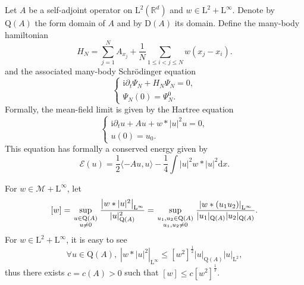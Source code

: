 \documentclass{article}
\def\R{\mathbb R}
\def\L{\mathrm L}
\def\Q{\mathrm Q}
\def \p {\partial}
\def\d{\mathrm{d}}
\newcommand{\Atop}[2]{\genfrac{}{}{0pt}{1}{#1}{#2}}
\theoremstyle{definition}
\numberwithin{equation}{section}
\newcommand{\complexI}{\mathrm{i}} %
\begin{document}
Let $A$ be a self-adjoint operator on $\L^2(\R^d)$ and $w\in\L^2+\L^\infty$. Denote by $\Q(A)$ the form domain of $A$ and by $\mathrm{D}(A)$ its domain. Define the many-body hamiltonian 
\begin{equation}\label{Eq:ManyBodyHamiltonian}
    H_{N} =\sum_{j=1}^N A_{x_j} + \frac{1}{N}\sum_{1\leqslant i<j\leqslant N} w(x_j-x_i).
\end{equation}
and the associated many-body Schrödinger equation 
\begin{equation}\label{Eq:ManyBodySchrodinger}
    \begin{cases}
    \complexI\p_t\Psi_N+H_{N}\Psi_N=0,\\
    \Psi_N(0)=\Psi_N^0.
    \end{cases}
\end{equation}
Formally, the mean-field limit is given by the Hartree equation
\begin{equation}\label{Eq:Hartree}
    \begin{cases}
    \complexI\p_t u + A u + w*|u|^2 u = 0,\\
    u(0)=u_0.
    \end{cases}
\end{equation}
This equation has formally a conserved energy given by
\begin{equation}\label{Eq:DefEnergyHartree}
    \mathcal{E}(u) = \frac{1}{2}\langle -A u,u\rangle - \frac{1}{4}\int|u|^2w*|u|^2\d x.
\end{equation}

For $w\in\mathcal{M}+\L^\infty$, let
\begin{equation}\label{Eq:Def[w]}
    [w] = \sup_{\Atop{u\in\Q(A)}{u\neq 0}}\frac{\left|w*|u|^2\right|_{\L^\infty}}{|u|_{\Q(A)}^2}\\
    = \sup_{\Atop{u_1,u_2\in\Q(A)}{u_1,u_2
    \neq 0}}\frac{\left|w*(u_1u_2)\right|_{\L^\infty}}{|u_1|_{\Q(A)}|u_2|_{\Q(A)}}.
\end{equation}
For $w\in\L^2+\L^\infty$, it is easy to see
\begin{equation}\label{Eq:Control[w]QL2}
    \forall u\in\Q(A),\; \left|w*|u|^2\right|_{\L^\infty} \leqslant \left[w^2\right]^{\frac{1}{2}}|u|_{\Q(A)}|u|_{\L^2},
\end{equation}
thus there exists $c=c(A)>0$ such that $[w]\leqslant c\left[w^2\right]^{\frac{1}{2}}$.\\
\end{document}
